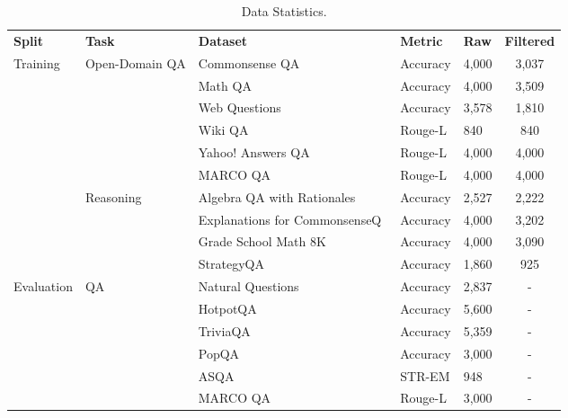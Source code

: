 \begin{table*}[t]
\begin{center}
\small
\begin{tabular}{l|l|l|l|l|c}
\hline
\textbf{Split}  &\textbf{Task}   &\textbf{Dataset} &\textbf{Metric}   &\textbf{Raw}  &\textbf{Filtered}\\ \cline{1-6}
\multirow{10}{*}{Training} & \multirow{6}{*}{Open-Domain QA}    
&  Commonsense QA~\citeyearpar{talmor2018commonsenseqa}   & Accuracy &4,000  &3,037\\
&& Math QA~\citeyearpar{amini2019mathqa}  & Accuracy &4,000 &3,509\\
&& Web Questions~\citeyearpar{berant2013semantic}   & Accuracy &3,578  &1,810\\
&& Wiki QA~\citeyearpar{yang2015wikiqa} &  Rouge-L &840 &840  \\
&& Yahoo! Answers QA &  Rouge-L &4,000 &4,000 \\
&& MARCO QA~\citeyearpar{bajaj2016ms}&  Rouge-L &4,000  &4,000\\ 
\cline{2-6}


&\multirow{4}{*}{Reasoning}
& Algebra QA with Rationales~\citeyearpar{ling2017program} & Accuracy &2,527 &2,222 \\
&&  Explanations for CommonsenseQ~\citeyearpar{aggarwal2021explanations}  & Accuracy &4,000  &3,202\\
&& Grade School Math 8K~\citeyearpar{cobbe2021training}  & Accuracy &4,000 &3,090 \\
&& StrategyQA~\citeyearpar{geva2021did} &Accuracy &1,860 &925 \\
\cline{1-6}

\multirow{6}{*}{Evaluation}  & \multirow{6}{*}{QA} &  
Natural Questions~\citeyearpar{kwiatkowski2019natural}  &Accuracy & 2,837 &-\\   
&&  HotpotQA~\citeyearpar{yang2018hotpotqa}   &Accuracy & 5,600  &-\\
& & TriviaQA~\citeyearpar{joshi2017triviaqa}    &Accuracy & 5,359 &-\\   
& &  PopQA~\citeyearpar{mallen-etal-2023-trust} &Accuracy & 3,000  &-\\
& &  ASQA~\citeyearpar{stelmakh-etal-2022-asqa} &STR-EM & 948  &-\\
& &  MARCO QA~\citeyearpar{bajaj2016ms} &Rouge-L & 3,000  &-\\
\cline{2-6}
\hline
\end{tabular}
\caption{Data Statistics.}
\label{table:dataset}
\end{center}
\end{table*}